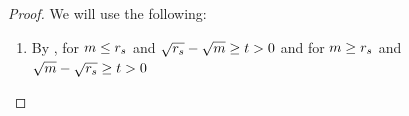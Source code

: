  \begin{proof}
We will use the following:
\begin{enumerate}[label=(S.\arabic*), leftmargin=*]
\item   \label{cond:lowerbound} By \cite[Corollary 5.35]{vershynin2010introduction},   for $m \leq r_s$ and $\sqrt{r_s} - \sqrt{m} \geq t > 0$ 
and   for  $m \geq r_s$ and $\sqrt{m} - \sqrt{r_s} \geq t > 0$ 


\end{enumerate}
\end{proof}
